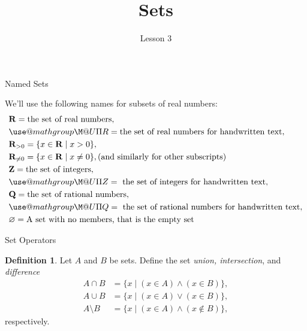 \documentclass[fleqn]{beamer}
\subtitle{Lesson 3}
\title{\textbf{Sets}}
\date{}
\makeatletter
\newcommand{\reals}{\mathbf{R}}
\newcommand{\integers}{\mathbf{Z}}
\theoremstyle{definition}
\newtheorem{mydef}{Definition}
\def\amsbb{\use@mathgroup \M@U \symAMSb}
\makeatother
\begin{document}
\frame{\titlepage}


\begin{frame}{Named Sets}

We'll use the following names for subsets of real numbers:
\begin{align*}
&\reals = \mbox{the set of real numbers}, \\
& \amsbb{R} =  \mbox{the set of real numbers for handwritten text}, \\
&\reals_{> 0} = \{x \in \reals  \mid  x > 0\}, \\
&\reals_{\neq 0}  =  \{x \in \reals  \mid   x \neq 0\},  \mbox{(and similarly for other subscripts)} \\
&\integers = \mbox{the set of integers}, \\
& \amsbb{Z} = \mbox{ the set of integers for handwritten text}, \\
&\mathbf{Q} = \mbox{the set of rational numbers}, \\
& \amsbb{Q} = \mbox{ the set of rational numbers for handwritten text}, \\
&\varnothing = \mbox{A set with no members, that is the empty set}
\end{align*}

\end{frame}


\begin{frame}{Set Operators} 

\begin{mydef}
Let \(A\) and \(B\) be sets. Define the set \emph{union, intersection}, and \emph{difference}
\begin{align*}
   A \cap B &= \{x  \mid  (x \in A)\land (x \in B) \}, \\
   A \cup B &= \{x  \mid (x \in A) \lor (x \in B) \}, \\
   A \setminus B &= \{x  \mid  (x \in A) \land (x \notin B) \},
\end{align*}
respectively.
\end{mydef}
\end{frame}
\end{document}
